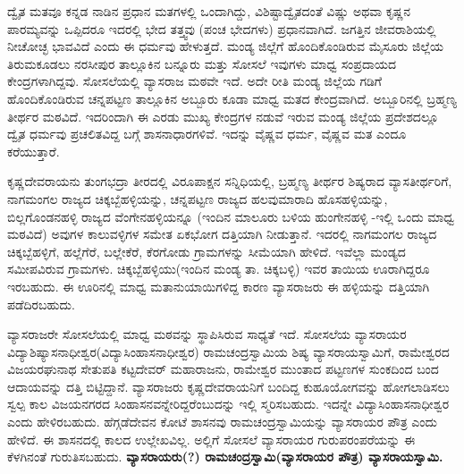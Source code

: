 ದ್ವೈತ ಮತವೂ ಕನ್ನಡ ನಾಡಿನ ಪ್ರಧಾನ ಮತಗಳಲ್ಲಿ ಒಂದಾಗಿದ್ದು, ವಿಶಿಷ್ಟಾದ್ವೈತದಂತೆ ವಿಷ್ಣು ಅಥವಾ ಕೃಷ್ಣನ ಪಾರಮ್ಯವನ್ನು ಒಪ್ಪಿದರೂ ಇದರಲ್ಲಿ ಭೇದ ತತ್ತ್ವವು (ಪಂಚ ಭೇದಗಳು) ಪ್ರಧಾನವಾಗಿದೆ. ಜಗತ್ತಿನ ಜೀವರಾಶಿಯಲ್ಲಿ ನೀಚೋಚ್ಛ ಭಾವವಿದೆ ಎಂದು ಈ ಧರ್ಮವು ಹೇಳುತ್ತದೆ. ಮಂಡ್ಯ ಜಿಲ್ಲೆಗೆ ಹೊಂದಿಕೊಂಡಿರುವ ಮೈಸೂರು ಜಿಲ್ಲೆಯ ತಿರುಮಕೂಡಲು ನರಸೀಪುರ ತಾಲ್ಲೂಕಿನ ಬನ್ನೂರು ಮತ್ತು ಸೋಸಲೆ ಇವುಗಳು ಮಾಧ್ವ ಸಂಪ್ರದಾಯದ ಕೇಂದ್ರಗಳಾಗಿದ್ದವು. ಸೋಸಲೆಯಲ್ಲಿ ವ್ಯಾಸರಾಜ ಮಠವೇ ಇದೆ. ಅದೇ ರೀತಿ ಮಂಡ್ಯ ಜಿಲ್ಲೆಯ ಗಡಿಗೆ ಹೊಂದಿಕೊಂಡಿರುವ ಚನ್ನಪಟ್ಟಣ ತಾಲ್ಲೂಕಿನ ಅಬ್ಬೂರು ಕೂಡಾ ಮಾಧ್ವ ಮತದ ಕೇಂದ್ರವಾಗಿದೆ. ಅಬ್ಬೂರಿನಲ್ಲಿ ಬ್ರಹ್ಮಣ್ಯ ತೀರ್ಥರ ಮಠವಿದೆ. ಇದರಿಂದಾಗಿ ಈ ಎರಡು ಮುಖ್ಯ ಕೇಂದ್ರಗಳ ನಡುವೆ ಇರುವ ಮಂಡ್ಯ ಜಿಲ್ಲೆಯ ಪ್ರದೇಶದಲ್ಲೂ ದ್ವೈತ ಧರ್ಮವು ಪ್ರಚಲಿತವಿದ್ದ ಬಗ್ಗೆ ಶಾಸನಾಧಾರಗಳಿವೆ. ಇದನ್ನು ವೈಷ್ಣವ ಧರ್ಮ, ವೈಷ್ಣವ ಮತ ಎಂದೂ ಕರೆಯುತ್ತಾರೆ.

ಕೃಷ್ಣದೇವರಾಯನು ತುಂಗಭದ್ರಾ ತೀರದಲ್ಲಿ ವಿರೂಪಾಕ್ಷನ ಸನ್ನಿಧಿಯಲ್ಲಿ, ಬ್ರಹ್ಮಣ್ಯ ತೀರ್ಥರ ಶಿಷ್ಯರಾದ ವ್ಯಾಸತೀರ್ಥ\-ರಿಗೆ, ನಾಗಮಂಗಲ ರಾಜ್ಯದ ಚಿಕ್ಕಬ್ಬೆಹಳ್ಳಿಯನ್ನು, ಚನ್ನಪಟ್ಟಣ ರಾಜ್ಯದ ಹಲವುಮಾರಾದಿ ಹೊಸಹಳ್ಳಿಯನ್ನು, ಬಿಲ್ಲಗೊಂಡನಹಳ್ಳಿ ರಾಜ್ಯದ ವೆಂಗೇನಹಳ್ಳಿಯನ್ನೂ (ಇಂದಿನ ಮಾಲೂರು ಬಳಿಯ ಹುಂಗೇನಹಳ್ಳಿ -ಇಲ್ಲಿ ಒಂದು ಮಾಧ್ವ ಮಠವಿದೆ) ಅವುಗಳ ಕಾಲುವಳ್ಳಿಗಳ ಸಮೇತ ಏಕಭೋಗ ದತ್ತಿಯಾಗಿ ನೀಡುತ್ತಾನೆ. ಇದರಲ್ಲಿ ನಾಗಮಂಗಲ ರಾಜ್ಯದ ಚಿಕ್ಕಬ್ಬೆಹಳ್ಳಿಗೆ, ಹಲ್ಲೆಗೆರೆ, ಬಲ್ಲೇಕೆರೆ, ಕೆರಗೋಡು ಗ್ರಾಮಗಳನ್ನು ಸೀಮೆಯಾಗಿ ಹೇಳಿದೆ. ಇವೆಲ್ಲಾ ಮಂಡ್ಯದ ಸಮೀಪವಿರುವ ಗ್ರಾಮಗಳು. ಚಿಕ್ಕಬ್ಬೆ\-ಹಳ್ಳಿಯು(ಇಂದಿನ ಮಂಡ್ಯ ತಾ. ಚಿಕ್ಕಬಳ್ಳಿ) ಇವರ ತಾಯಿಯ ಊರಾಗಿದ್ದರೂ ಇರಬಹುದು. ಈ ಊರಿನಲ್ಲಿ ಮಾಧ್ವ ಮತಾನುಯಾಯಿಗಳಿದ್ದ ಕಾರಣ ವ್ಯಾಸರಾಜರು ಈ ಹಳ್ಳಿಯನ್ನು ದತ್ತಿಯಾಗಿ ಪಡೆದಿರಬಹುದು.

ವ್ಯಾಸರಾಜರೇ ಸೋಸಲೆಯಲ್ಲಿ ಮಾಧ್ವ ಮಠವನ್ನು ಸ್ಥಾಪಿಸಿರುವ ಸಾಧ್ಯತೆ ಇದೆ. ಸೋಸಲೆಯ ವ್ಯಾಸರಾಯರ ವಿದ್ಯಾಶಿಷ್ಯಾಸನಾಧೀಶ್ವರ(ವಿದ್ಯಾಸಿಂಹಾಸನಾಧೀಶ್ವರ) ರಾಮಚಂದ್ರಸ್ವಾಮಿಯ ಶಿಷ್ಯ ವ್ಯಾಸರಾಯಸ್ವಾಮಿಗೆ, ರಾಮೇಶ್ವರದ ವಿಜಯರಘುನಾಥ ಸೇತುಪತಿ ಕಟ್ಟದೇವರ್​ ಮಹಾರಾಜನು, ರಾಮೇಶ್ವರ ಮುಂತಾದ ಪಟ್ಟಣಗಳ ಸುಂಕದಿಂದ ಬಂದ ಆದಾಯವನ್ನು ದತ್ತಿ ಬಿಟ್ಟಿದ್ದಾನೆ. ವ್ಯಾಸರಾಜರು ಕೃಷ್ಣದೇವರಾಯನಿಗೆ ಬಂದಿದ್ದ ಕುಹೂಯೋಗವನ್ನು ಹೋಗಲಾಡಿಸಲು ಸ್ವಲ್ಪ ಕಾಲ ವಿಜಯನಗರದ ಸಿಂಹಾಸನವನ್ನೇರಿದ್ದರೆಂಬುದನ್ನು ಇಲ್ಲಿ ಸ್ಮರಿಸಬಹುದು. ಇದನ್ನೇ ವಿದ್ಯಾಸಿಂಹಾಸನಾಧೀಶ್ವರ ಎಂದು ಹೇಳಿರಬಹುದು. ಹೆಗ್ಗಡೆದೇವನ ಕೋಟೆ ಶಾಸನವು ರಾಮಚಂದ್ರಸ್ವಾಮಿಯನ್ನು ವ್ಯಾಸರಾಯರ ಪೌತ್ರ ಎಂದು ಹೇಳಿದೆ. ಈ ಶಾಸನದಲ್ಲಿ ಕಾಲದ ಉಲ್ಲೇಖವಿಲ್ಲ. ಅಲ್ಲಿಗೆ ಸೋಸಲೆ ವ್ಯಾಸರಾಯರ ಗುರುಪರಂಪರೆಯನ್ನು ಈ ಕೆಳಗಿನಂತೆ ಗುರುತಿಸಬಹುದು. \textbf{ವ್ಯಾಸರಾಯರು(?) ರಾಮಚಂದ್ರಸ್ವಾಮಿ(ವ್ಯಾಸರಾಯರ ಪೌತ್ರ)  ವ್ಯಾಸರಾಯಸ್ವಾಮಿ.}

